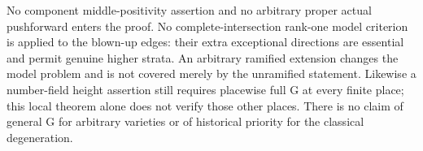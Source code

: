 No component middle-positivity assertion and no arbitrary
proper actual pushforward enters the proof.
No complete-intersection rank-one model criterion is applied
to the blown-up edges: their extra exceptional directions
are essential and permit genuine higher strata.
An arbitrary ramified extension changes the model problem
and is not covered merely by the unramified statement.
Likewise a number-field height assertion still requires
placewise full G at every finite place; this local theorem
alone does not verify those other places.
There is no claim of general G for arbitrary varieties or
of historical priority for the classical degeneration.
